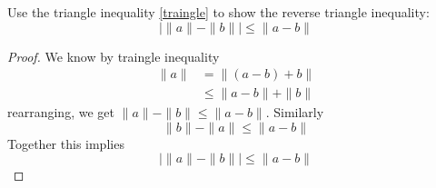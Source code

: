 \documentclass[openany]{book}
\begin{document}
\begin{prob}
    Use the triangle inequality \ref{traingle} to show the reverse triangle inequality:
    \begin{equation*}
        \bigg|\|a\|-\|b\|\bigg|\leq\|a-b\|
    \end{equation*}
\end{prob}
\begin{proof}
    We know by traingle inequality 
    \begin{align*}
        \|a\|&=\|(a-b)+b\|\\
        &\leq \|a-b\|+\|b\|
    \end{align*}
    rearranging, we get $\|a\|-\|b\|\leq\|a-b\|$. Similarly 
    \begin{equation*}
        \|b\|-\|a\|\leq \|a-b\|
    \end{equation*}
    Together this implies 
    \begin{equation*}
        \bigg|\|a\|-\|b\|\bigg|\leq\|a-b\|
    \end{equation*}
\end{proof}
\end{document}
